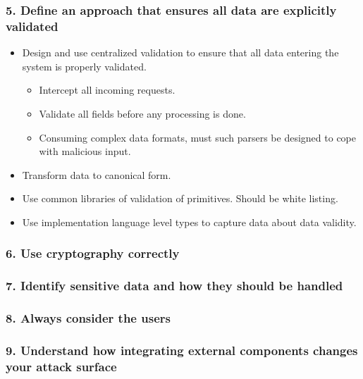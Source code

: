 \documentclass[12pt,norsk]{beamer}
\begin{document}
\begin{frame}

	\frametitle{5. Define an approach that ensures all data are explicitly validated}
	
	\begin{itemize}
		\item Design and use centralized validation to ensure that all data entering the system is properly validated. 
		\begin{itemize}
			\item Intercept all incoming requests.
			\item Validate all fields before any processing is done.
			\item Consuming complex data formats, must such parsers be designed to cope with malicious input.

		\end{itemize}

		\item Transform data to canonical form.
		\item Use common libraries of validation of primitives. Should be white listing. 
		\item Use implementation language level types to capture data about data validity. 				
	
	\end{itemize}
	

\end{frame}

\begin{frame}

	\frametitle{6. Use cryptography correctly}
	

\end{frame}

\begin{frame}

	\frametitle{7. Identify sensitive data and how they should be handled}
	

\end{frame}

\begin{frame}

	\frametitle{8. Always consider the users}
	

\end{frame}

\begin{frame}

	\frametitle{9. Understand how integrating external components changes your attack surface}
	

\end{frame}
\end{document}
